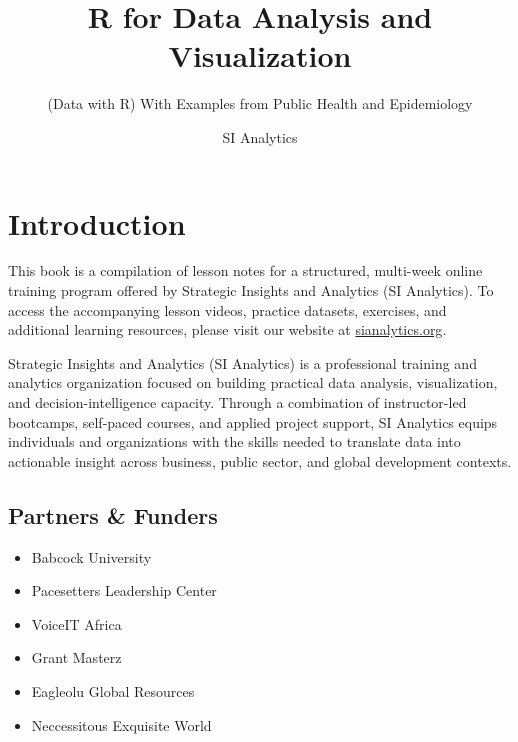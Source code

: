 \documentclass[
  letterpaper,
  DIV=11,
  numbers=noendperiod]{scrreprt}
\title{R for Data Analysis and Visualization}
\subtitle{(Data with R) With Examples from Public Health and
Epidemiology}
\author{SI Analytics}
\date{}
\providecommand{\tightlist}{%
  \setlength{\itemsep}{0pt}\setlength{\parskip}{0pt}}\usepackage{longtable,booktabs,array}
\renewcommand*\contentsname{Table of contents}
\newcommand\contentsname{Table of contents}
\begin{document}
\maketitle

\pagestyle{mystyle}

\renewcommand*\contentsname{Table of contents}
{
\hypersetup{linkcolor=}
\setcounter{tocdepth}{2}
\tableofcontents
}


\chapter*{Introduction}\label{introduction}


This book is a compilation of lesson notes for a structured, multi-week
online training program offered by Strategic Insights and Analytics (SI
Analytics). To access the accompanying lesson videos, practice datasets,
exercises, and additional learning resources, please visit our website
at \href{https://www.sianalytics.org}{sianalytics.org}.

Strategic Insights and Analytics (SI Analytics) is a professional
training and analytics organization focused on building practical data
analysis, visualization, and decision-intelligence capacity. Through a
combination of instructor-led bootcamps, self-paced courses, and applied
project support, SI Analytics equips individuals and organizations with
the skills needed to translate data into actionable insight across
business, public sector, and global development contexts.

\section*{Partners \& Funders}\label{partners-funders}


\begin{itemize}
\tightlist
\item
  Babcock University
\item
  Pacesetters Leadership Center
\item
  VoiceIT Africa
\item
  Grant Masterz
\item
  Eagleolu Global Resources
\item
  Neccessitous Exquisite World
\end{itemize}
\end{document}
